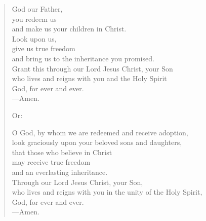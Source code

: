 \prayer

\setlength{\leftmargini}{\prayerleftmargini}

\begin{verse}
God our Father,\\
you redeem us\\
and make us your children in Christ.\\
Look upon us,\\
give us true freedom\\
and bring us to the inheritance you promised.\\
Grant this through our Lord Jesus Christ, your Son\\
who lives and reigns with you and the Holy Spirit\\
God, for ever and ever.\\
{\color{red}---\thinspace}Amen.

{\color{red}Or:}

O God, by whom we are redeemed and receive adoption,\\
look graciously upon your beloved sons and daughters,\\
that those who believe in Christ\\
may receive true freedom\\
and an everlasting inheritance.\\
Through our Lord Jesus Christ, your Son,\\
who lives and reigns with you in the unity of the Holy Spirit,\\
God, for ever and ever.\\
{\color{red}---\thinspace}Amen.
\end{verse}

\setlength{\leftmargini}{\defleftmargini}